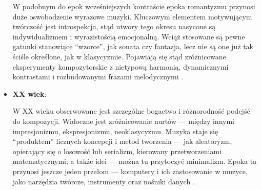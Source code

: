 \begin{itemize}
	      W podobnym do epok wcześniejszych kontraście epoka romantyzmu przynosi duże oswobodzenie wyrazowe muzyki.
	      Kluczowym elementem motywującym twórczość jest introspekcja, stąd utwory tego okresu nasycone są indywidualizmem
	      i wyrazistością emocjonalną.
	      Wciąż stosowane są pewne gatunki stanowiące \enquote{wzorce}, jak sonata czy fantazja,
	      lecz nie są one już tak ściśle określone, jak w klasycyzmie.
	      Pojawiają się stąd zróżnicowane eksperymenty kompozytorskie z nietypową harmonią, dynamicznymi kontrastami i
	      rozbudowanymi frazami melodycznymi \cite{estetyka}.
	\item \textbf{XX wiek}:

	      W XX wieku obserwowane jest szczególne bogactwo i różnorodność podejść do kompozycji.
	      Widoczne jest zróżnicowanie nurtów — między innymi impresjonizmu, ekspresjonizmu, neoklasycyzmu.
	      Muzyka staje się \enquote{produktem} licznych koncepcji i metod tworzenia — jak aleatoryzm, opierający
	      się o losowość lub serializm, kierowany przetworzeniami matematycznymi; a także idei — można tu przytoczyć minimalizm.
	      Epoka ta przynosi jeszcze jeden przełom — komputery i ich zastosowanie w muzyce,
	      jako narzędzia twórcze, instrumenty oraz nośniki danych \cite{atlas2}.
\end{itemize}

